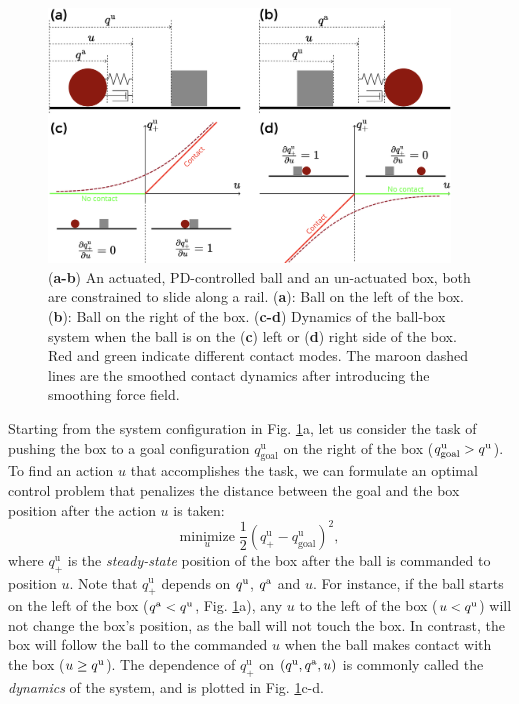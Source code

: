 \begin{figure}[t]
\centering\includegraphics[width = 0.95\textwidth]{figures/01_intro/1d_box_ball.png}
\caption{(\textbf{a-b}) An actuated, PD-controlled ball and an un-actuated box, both are constrained to slide along a rail. (\textbf{a}): Ball on the left of the box. (\textbf{b}): Ball on the right of the box. (\textbf{c-d}) Dynamics of the ball-box system when the ball is on the (\textbf{c}) left or (\textbf{d}) right side of the box. Red and green indicate different contact modes. The maroon dashed lines are the smoothed contact dynamics after introducing the smoothing force field.}
\label{fig:intro:1d_box_ball}
\end{figure}

Starting from the system configuration in Fig. \ref{fig:intro:1d_box_ball}a,
let us consider the task of pushing the box to a goal configuration $q^\mathrm{u}_\text{goal}$ on the right of the box ($q^\mathrm{u}_\text{goal} > {q^\mathrm{u}}$). To find an action $u$ that accomplishes the task, we can formulate an optimal control problem that penalizes the distance between the goal and the box position after the action $u$ is taken: %
\begin{equation}
\label{eq:intro:simple_task_objective}
\underset{u}{\mathrm{minimize}} \; \frac{1}{2}(q^\mathrm{u}_+ - q^\mathrm{u}_\text{goal})^2, %
\end{equation}
where $q^\mathrm{u}_+$ is the \emph{steady-state} position of the box after the ball is commanded to position $u$. Note that $q_+^\mathrm{u}$ depends on ${q^\mathrm{u}}$, ${q^\mathrm{a}}$ and $u$. For instance, if the ball starts on the left of the box (${q^\mathrm{a}} < {q^\mathrm{u}}$, Fig. \ref{fig:intro:1d_box_ball}a), any $u$ to the left of the box ($u < {q^\mathrm{u}}$) will not change the box's position, as the ball will not touch the box. In contrast, the box will follow the ball to the commanded $u$ when the ball makes contact with the box ($u \geq {q^\mathrm{u}}$). 
The dependence of $q^\mathrm{u}_+$ on $({q^\mathrm{u}}, {q^\mathrm{a}}, u)$ is commonly called the \emph{dynamics} of the system, and is plotted in Fig. \ref{fig:intro:1d_box_ball}c-d.

